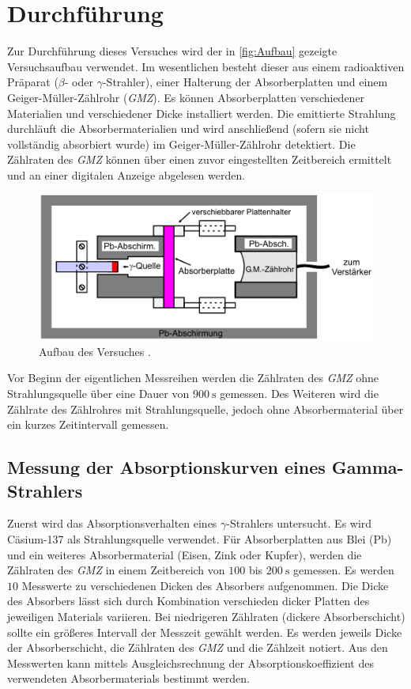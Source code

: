 \section{Durchführung}
\label{sec:Durchführung}
Zur Durchführung dieses Versuches wird der in \autoref{fig:Aufbau} gezeigte Versuchsaufbau verwendet. Im wesentlichen besteht dieser aus einem radioaktiven Präparat
($\beta$- oder $\gamma$-Strahler), einer Halterung der Absorberplatten und einem Geiger-Müller-Zählrohr (\textit{GMZ}). Es können Absorberplatten verschiedener Materialien und verschiedener
Dicke installiert werden.
Die emittierte Strahlung durchläuft die Absorbermaterialien und wird anschließend (sofern sie nicht vollständig absorbiert wurde) im Geiger-Müller-Zählrohr detektiert. 
Die Zählraten des \textit{GMZ} können über einen zuvor eingestellten Zeitbereich ermittelt und an einer digitalen Anzeige abgelesen werden.

\begin{figure}
    \centering
    \includegraphics[width = .7\textwidth]{content/Aufbau.png}
    \caption{Aufbau des Versuches \cite{v704}.}
    \label{fig:Aufbau}
\end{figure}

Vor Beginn der eigentlichen Messreihen werden die Zählraten des \textit{GMZ} ohne Strahlungsquelle über eine Dauer von $\qty{900}{\second}$ gemessen. 
Des Weiteren wird die Zählrate des Zählrohres mit Strahlungsquelle, jedoch ohne Absorbermaterial über ein kurzes Zeitintervall gemessen.

\subsection{Messung der Absorptionskurven eines Gamma-Strahlers}
\label{subsec:D_gamma}
Zuerst wird das Absorptionsverhalten eines $\gamma$-Strahlers untersucht. Es wird Cäsium-137 als Strahlungsquelle verwendet. Für Absorberplatten aus Blei (Pb) und ein weiteres
Absorbermaterial (Eisen, Zink oder Kupfer), werden die Zählraten des \textit{GMZ} in einem Zeitbereich von $\num{100}$ bis $\qty{200}{\second}$ gemessen. Es werden 
$10$ Messwerte zu verschiedenen Dicken des Absorbers aufgenommen. Die Dicke des Absorbers lässt sich durch Kombination verschieden dicker Platten des jeweiligen Materials
variieren. Bei niedrigeren Zählraten (dickere Absorberschicht) sollte ein größeres Intervall der Messzeit gewählt werden. Es werden jeweils Dicke der Absorberschicht,
die Zählraten des \textit{GMZ} und die Zählzeit notiert. 
Aus den Messwerten kann mittels Ausgleichsrechnung der Absorptionskoeffizient des verwendeten Absorbermaterials bestimmt werden.

